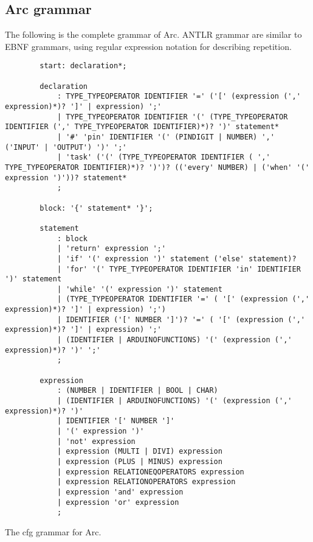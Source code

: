 \subsection{Arc grammar}\label{sec:arcgrammar}
The following is the complete grammar of Arc. ANTLR grammar are similar to EBNF grammars, using regular expression notation for describing repetition.

\begin{listing}[htb!]
    \begin{verbatim}
        start: declaration*;

        declaration
            : TYPE_TYPEOPERATOR IDENTIFIER '=' ('[' (expression (',' expression)*)? ']' | expression) ';'
            | TYPE_TYPEOPERATOR IDENTIFIER '(' (TYPE_TYPEOPERATOR IDENTIFIER (',' TYPE_TYPEOPERATOR IDENTIFIER)*)? ')' statement*
            | '#' 'pin' IDENTIFIER '(' (PINDIGIT | NUMBER) ',' ('INPUT' | 'OUTPUT') ')' ';'
            | 'task' ('(' (TYPE_TYPEOPERATOR IDENTIFIER ( ',' TYPE_TYPEOPERATOR IDENTIFIER)*)? ')')? (('every' NUMBER) | ('when' '(' expression ')'))? statement*
            ;

        block: '{' statement* '}';

        statement
            : block
            | 'return' expression ';'
            | 'if' '(' expression ')' statement ('else' statement)?
            | 'for' '(' TYPE_TYPEOPERATOR IDENTIFIER 'in' IDENTIFIER ')' statement
            | 'while' '(' expression ')' statement
            | (TYPE_TYPEOPERATOR IDENTIFIER '=' ( '[' (expression (',' expression)*)? ']' | expression) ';')
            | IDENTIFIER ('[' NUMBER ']')? '=' ( '[' (expression (',' expression)*)? ']' | expression) ';'
            | (IDENTIFIER | ARDUINOFUNCTIONS) '(' (expression (',' expression)*)? ')' ';'
            ;

        expression
            : (NUMBER | IDENTIFIER | BOOL | CHAR)
            | (IDENTIFIER | ARDUINOFUNCTIONS) '(' (expression (',' expression)*)? ')'
            | IDENTIFIER '[' NUMBER ']'
            | '(' expression ')'
            | 'not' expression
            | expression (MULTI | DIVI) expression
            | expression (PLUS | MINUS) expression
            | expression RELATIONEQOPERATORS expression
            | expression RELATIONOPERATORS expression
            | expression 'and' expression
            | expression 'or' expression
            ;
    \end{verbatim}
    \caption{The \gls{cfg} grammar for Arc.}
    \label{lst:arccfg}
\end{listing}




